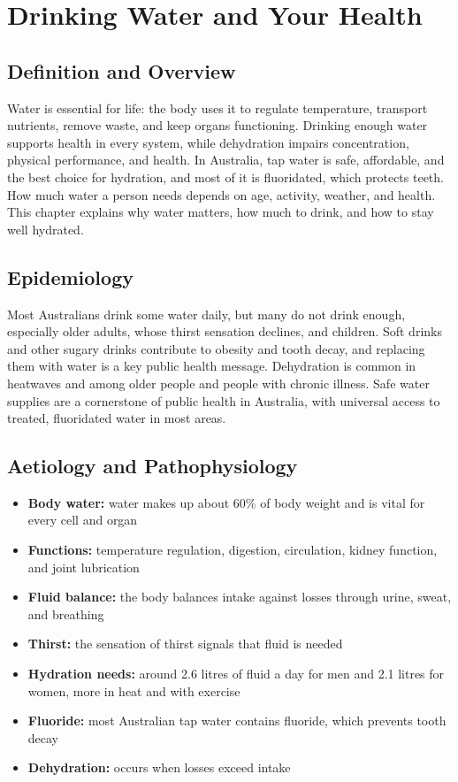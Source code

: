 \chapter{Drinking Water and Your Health}

\section*{Definition and Overview}
Water is essential for life: the body uses it to regulate temperature, transport nutrients, remove waste, and keep organs functioning. Drinking enough water supports health in every system, while dehydration impairs concentration, physical performance, and health. In Australia, tap water is safe, affordable, and the best choice for hydration, and most of it is fluoridated, which protects teeth. How much water a person needs depends on age, activity, weather, and health. This chapter explains why water matters, how much to drink, and how to stay well hydrated.

\section*{Epidemiology}
Most Australians drink some water daily, but many do not drink enough, especially older adults, whose thirst sensation declines, and children. Soft drinks and other sugary drinks contribute to obesity and tooth decay, and replacing them with water is a key public health message. Dehydration is common in heatwaves and among older people and people with chronic illness. Safe water supplies are a cornerstone of public health in Australia, with universal access to treated, fluoridated water in most areas.

\section*{Aetiology and Pathophysiology}
\begin{itemize}
    \item \textbf{Body water:} water makes up about 60\% of body weight and is vital for every cell and organ
    \item \textbf{Functions:} temperature regulation, digestion, circulation, kidney function, and joint lubrication
    \item \textbf{Fluid balance:} the body balances intake against losses through urine, sweat, and breathing
    \item \textbf{Thirst:} the sensation of thirst signals that fluid is needed
    \item \textbf{Hydration needs:} around 2.6 litres of fluid a day for men and 2.1 litres for women, more in heat and with exercise
    \item \textbf{Fluoride:} most Australian tap water contains fluoride, which prevents tooth decay
    \item \textbf{Dehydration:} occurs when losses exceed intake
\end{itemize}

